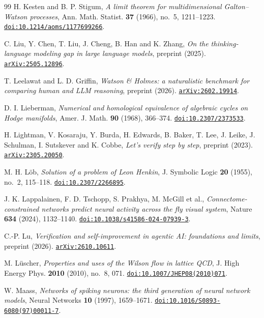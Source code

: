\begin{thebibliography}{99}
H. Kesten and B. P. Stigum,
\emph{A limit theorem for multidimensional Galton--Watson processes},
Ann. Math. Statist. \textbf{37} (1966), no.~5, 1211--1223.
\href{https://doi.org/10.1214/aoms/1177699266}{\nolinkurl{doi:10.1214/aoms/1177699266}}.

C. Liu, Y. Chen, T. Liu, J. Cheng, B. Han and K. Zhang,
\emph{On the thinking-language modeling gap in large language models},
preprint (2025).
\href{https://arxiv.org/abs/2505.12896}{\nolinkurl{arXiv:2505.12896}}.

T. Leelawat and L. D. Griffin,
\emph{Watson \& Holmes: a naturalistic benchmark for comparing human and LLM reasoning},
preprint (2026).
\href{https://arxiv.org/abs/2602.19914}{\nolinkurl{arXiv:2602.19914}}.

D. I. Lieberman,
\emph{Numerical and homological equivalence of algebraic cycles on Hodge manifolds},
Amer. J. Math. \textbf{90} (1968), 366--374.
\href{https://doi.org/10.2307/2373533}{\nolinkurl{doi:10.2307/2373533}}.

H. Lightman, V. Kosaraju, Y. Burda, H. Edwards, B. Baker, T. Lee, J. Leike, J. Schulman, I. Sutskever and K. Cobbe,
\emph{Let's verify step by step},
preprint (2023).
\href{https://arxiv.org/abs/2305.20050}{\nolinkurl{arXiv:2305.20050}}.

M. H. L\"ob,
\emph{Solution of a problem of Leon Henkin},
J. Symbolic Logic \textbf{20} (1955), no.~2, 115--118.
\href{https://doi.org/10.2307/2266895}{\nolinkurl{doi:10.2307/2266895}}.

J. K. Lappalainen, F. D. Tschopp, S. Prakhya, M. McGill et al.,
\emph{Connectome-constrained networks predict neural activity across the fly visual system},
Nature \textbf{634} (2024), 1132--1140.
\href{https://doi.org/10.1038/s41586-024-07939-3}{\nolinkurl{doi:10.1038/s41586-024-07939-3}}.

C.-P. Lu,
\emph{Verification and self-improvement in agentic AI: foundations and limits},
preprint (2026).
\href{https://arxiv.org/abs/2610.10611}{\nolinkurl{arXiv:2610.10611}}.

M. L\"uscher,
\emph{Properties and uses of the Wilson flow in lattice QCD},
J. High Energy Phys. \textbf{2010} (2010), no.~8, 071.
\href{https://doi.org/10.1007/JHEP08(2010)071}{\nolinkurl{doi:10.1007/JHEP08(2010)071}}.

W. Maass,
\emph{Networks of spiking neurons: the third generation of neural network models},
Neural Networks \textbf{10} (1997), 1659--1671.
\href{https://doi.org/10.1016/S0893-6080(97)00011-7}{\nolinkurl{doi:10.1016/S0893-6080(97)00011-7}}.


\end{thebibliography}
